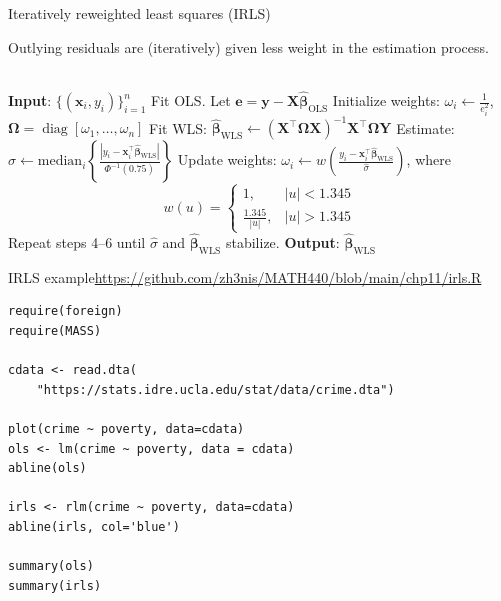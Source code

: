 \documentclass{beamer}
\DeclareMathOperator{\diag}{diag}
\begin{document}
\begin{frame}{Iteratively reweighted least squares (IRLS)}
\begin{small}
Outlying residuals are (iteratively) given less weight in the estimation process.\\~\\

\begin{algorithm}[H]
\DontPrintSemicolon
\textbf{Input}: $\{(\mathbf{x}_i, {y}_i)\}_{i=1}^n$\;
Fit OLS. Let $\mathbf{e}=\mathbf{y}-\mathbf{X}\hat{\boldsymbol\beta}_\text{OLS}$\;
Initialize weights: $\omega_i\leftarrow\frac{1}{e_i^2}$, $\mathbf{\Omega}=\diag[\omega_1,\ldots,\omega_n]$\;
Fit WLS: $\hat{\boldsymbol\beta}_{\text{WLS}}\leftarrow(\mathbf{X}^\top\mathbf{\Omega X})^{-1}\mathbf{X}^\top\mathbf{\Omega}\mathbf{Y}$\;
Estimate: $\hat{\sigma}\leftarrow\mathrm{median}_i\left\{\frac{|y_i-\mathbf{x}_i^\top\hat{\boldsymbol\beta}_{\text{WLS}}|}{\Phi^{-1}(0.75)}\right\}$\;
Update weights: $\omega_i\leftarrow w\left(\frac{y_i-\mathbf{x}_i^\top\hat{\boldsymbol\beta}_{\text{WLS}}}{\hat{\sigma}}\right)$, where
$$
w(u)=\begin{cases}
1,\quad &|u|<1.345\\
\frac{1.345}{|u|},&|u|>1.345
\end{cases}
$$\;\vspace{-10pt}
Repeat steps 4--6 until $\hat{\sigma}$ and $\hat{\boldsymbol\beta}_{\text{WLS}}$ stabilize.\;
\textbf{Output}: $\hat{\boldsymbol\beta}_{\text{WLS}}$
\caption{IRLS}
\end{algorithm}
\end{small}
\end{frame}

\begin{frame}[fragile]{IRLS example}{\url{https://github.com/zh3nis/MATH440/blob/main/chp11/irls.R}}
\begin{verbatim}
require(foreign)
require(MASS)

cdata <- read.dta(
    "https://stats.idre.ucla.edu/stat/data/crime.dta")

plot(crime ~ poverty, data=cdata)
ols <- lm(crime ~ poverty, data = cdata)
abline(ols)

irls <- rlm(crime ~ poverty, data=cdata)
abline(irls, col='blue')

summary(ols)
summary(irls)
\end{verbatim}    
\end{frame}
\end{document}
